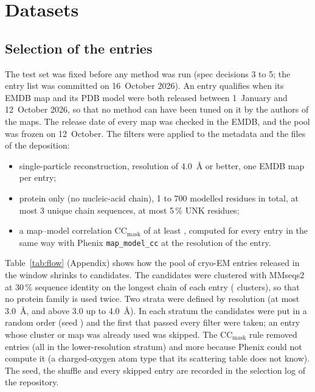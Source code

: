 \section{Datasets}\label{sec:datasets}

\subsection{Selection of the entries}
The test set was fixed before any method was run (spec decisions 3 to 5; the entry list was committed on 16~October 2026). An entry qualifies when its EMDB map and its PDB model were both released between 1~January and 12~October 2026, so that no method can have been tuned on it by the authors of the maps. The release date of every map was checked in the EMDB, and the pool was frozen on 12~October. The filters were applied to the metadata and the files of the deposition:

\begin{itemize}
\item single-particle reconstruction, resolution of 4.0~\AA{} or better, one EMDB map per entry;
\item protein only (no nucleic-acid chain), 1 to 700 modelled residues in total, at most 3 unique chain sequences, at most 5\,\% UNK residues;
\item a map--model correlation CC$_\text{mask}$ of at least \SelCcMin{}, computed for every entry in the same way with Phenix \texttt{map\_model\_cc} at the resolution of the entry.
\end{itemize}
Table~\ref{tab:flow} (Appendix) shows how the pool of \PoolAll{} cryo-EM entries released in the window shrinks to \PoolFinal{} candidates. The candidates were clustered with MMseqs2 \citep{steinegger2017mmseqs2} at 30\,\% sequence identity on the longest chain of each entry (\SelClusters{} clusters), so that no protein family is used twice. Two strata were defined by resolution (at most 3.0~\AA{}, and above 3.0 up to 4.0~\AA{}). In each stratum the candidates were put in a random order (seed \SelSeed{}) and the first \SelLow{} that passed every filter were taken; an entry whose cluster or map was already used was skipped. The CC$_\text{mask}$ rule removed \SelCcRejected{} entries (all in the lower-resolution stratum) and \SelCcFailed{} more because Phenix could not compute it (a charged-oxygen atom type that its scattering table does not know). The seed, the shuffle and every skipped entry are recorded in the selection log of the repository.

